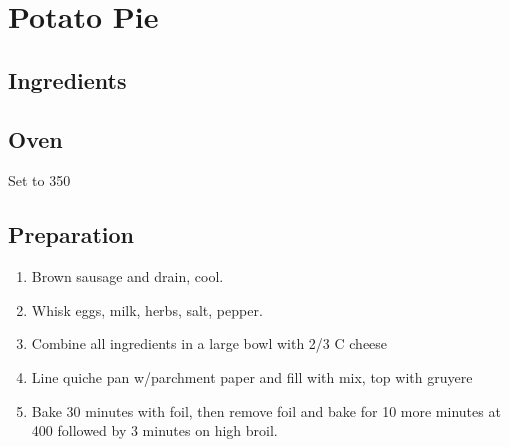 \documentclass[letterpaper,10pt,english]{sphinxmanual}
\begin{document}
\chapter{Potato Pie}
\label{\detokenize{Potato_Pie:potato-pie}}\label{\detokenize{Potato_Pie::doc}}

\section{Ingredients}
\label{\detokenize{Potato_Pie:ingredients}}
%
\begin{sphinxVerbatim}[commandchars=\\\{\}]
   
 
  
    
  
   
   
   
\end{sphinxVerbatim}


\section{Oven}
\label{\detokenize{Potato_Pie:oven}}
Set to 350


\section{Preparation}
\label{\detokenize{Potato_Pie:preparation}}\begin{enumerate}
\item {} 
Brown sausage and drain, cool.

\item {} 
Whisk eggs, milk, herbs, salt, pepper.

\item {} 
Combine all ingredients in a large bowl with 2/3 C cheese

\item {} 
Line quiche pan w/parchment paper and fill with mix, top with gruyere

\item {} 
Bake 30 minutes with foil, then remove foil and bake for 10 more minutes at 400 followed by 3 minutes on high broil.

\end{enumerate}
\end{document}
